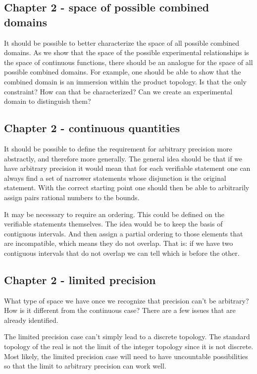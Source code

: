 \documentclass[11pt,letterpaper,fleqn]{memoir} %
\begin{document}
\subsection{Chapter 2 - space of possible combined domains}

It should be possible to better characterize the space of all possible combined domains. As we show that the space of the possible experimental relationships is the space of continuous functions, there should be an analogue for the space of all possible combined domains. For example, one should be able to show that the combined domain is an immersion within the product topology. Is that the only constraint? How can that be characterized? Can we create an experimental domain to distinguish them?

\subsection{Chapter 2 - continuous quantities}

It should be possible to define the requirement for arbitrary precision more abstractly, and therefore more generally. The general idea should be that if we have arbitrary precision it would mean that for each verifiable statement one can always find a set of narrower statements whose disjunction is the original statement. With the correct starting point one should then be able to arbitrarily assign pairs rational numbers to the bounds.

It may be necessary to require an ordering. This could be defined on the verifiable statements themselves. The idea would be to keep the basis of contiguous intervals. And then assign a partial ordering to those elements that are incompatible, which means they do not overlap. That is: if we have two contiguous intervals that do not overlap we can tell which is before the other.

\subsection{Chapter 2 - limited precision}

What type of space we have once we recognize that precision can't be arbitrary? How is it different from the continuous case? There are a few issues that are already identified.

The limited precision case can't simply lead to a discrete topology. The standard topology of the real is not the limit of the integer topology since it is not discrete. Most likely, the limited precision case will need to have uncountable possibilities so that the limit to arbitrary precision can work well.
\end{document}
